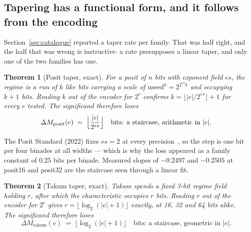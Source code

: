 \documentclass[11pt]{article}
\newtheorem{theorem}{Theorem}
\theoremstyle{definition}
\begin{document}
\subsection{Tapering has a functional form, and it follows from the encoding}
\label{sec:taperlaw}

Section~\ref{sec:catalogue} reported a taper rate per family. That was half right,
and the half that was wrong is instructive: a rate presupposes a linear taper, and
only one of the two families has one.

\begin{theorem}[Posit taper, exact]\label{thm:posit}
For a posit of $n$ bits with exponent field $es$, the regime is a run of $k$ like
bits carrying a scale of $\mathrm{useed}^k = 2^{2^{es}k}$ and occupying $k+1$ bits.
Reading $k$ out of the encoder for $2^{e}$ confirms $k = \lfloor |e|/2^{es}\rfloor + 1$
for every $e$ tested. The significand therefore loses
\[
  \Delta M_{\text{posit}}(e) \;=\; \Bigl\lfloor \frac{|e|}{2^{es}} \Bigr\rfloor
  \quad\text{bits: a staircase, arithmetic in } |e| .
\]
\end{theorem}

The Posit Standard (2022) fixes $es = 2$ at every precision~\cite{gustafson}, so
the step is one bit per four binades at all widths --- which is why the loss
appeared as a family constant of $0.25$ bits per binade. Measured slopes of
$-0.2497$ and $-0.2505$ at posit16 and posit32 are the staircase seen through a
linear fit.

\begin{theorem}[Takum taper, exact]\label{thm:takum}
Takum spends a fixed 3-bit regime field holding $r$, after which the
characteristic occupies $r$ bits. Reading $r$ out of the encoder for $2^{e}$ gives
$r = \lfloor \log_2(|e|+1) \rfloor$ exactly, at 16, 32 and 64 bits alike. The
significand therefore loses
\[
  \Delta M_{\text{takum}}(e) \;=\; \bigl\lfloor \log_2(|e|+1) \bigr\rfloor
  \quad\text{bits: a staircase, geometric in } |e| .
\]
\end{theorem}
\end{document}
